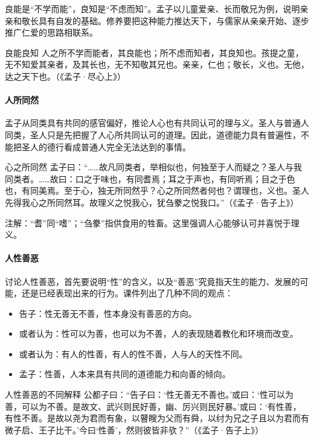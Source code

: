 良能是“不学而能”，良知是“不虑而知”。孟子以儿童爱亲、长而敬兄为例，说明亲亲和敬长具有自发的基础。修养要把这种能力推达天下，与儒家从亲亲开始、逐步推广仁爱的思路相联系。

\begin{fancybox}{良能良知}
    人之所不学而能者，其良能也；所不虑而知者，其良知也。孩提之童，无不知爱其亲者，及其长也，无不知敬其兄也。亲亲，仁也；敬长，义也。无他，达之天下也。（《孟子·尽心上》）
\end{fancybox}

\paragraph{人所同然}

孟子从同类具有共同的感官偏好，推论人心也有共同认可的理与义。圣人与普通人同类，圣人只是先把握了人心所共同认可的道理。因此，道德能力具有普遍性，不能把圣人的德行看成普通人完全无法达到的事情。

\begin{fancybox}{心之所同然}
    孟子曰：“……故凡同类者，举相似也，何独至于人而疑之？圣人与我同类者。……故曰：口之于味也，有同耆焉；耳之于声也，有同听焉；目之于色也，有同美焉。至于心，独无所同然乎？心之所同然者何也？谓理也，义也。圣人先得我心之所同然耳。故理义之悦我心，犹刍豢之悦我口。”（《孟子·告子上》）
\end{fancybox}

注解：“耆”同“嗜”；“刍豢”指供食用的牲畜。这里强调人心能够认可并喜悦于理义。

\paragraph{人性善恶}

讨论人性善恶，首先要说明“性”的含义，以及“善恶”究竟指天生的能力、发展的可能，还是已经表现出来的行为。课件列出了几种不同的观点：

\begin{itemize}
    \item 告子：性无善无不善，性本身没有善恶的方向。
    \item 或者认为：性可以为善，也可以为不善，人的表现随着教化和环境而改变。
    \item 或者认为：有人的性善，有人的性不善，人与人的天性不同。
    \item 孟子：性善，人本来具有共同的道德能力和向善的倾向。
\end{itemize}

\begin{fancybox}{人性善恶的不同解释}
    公都子曰：“告子曰：‘性无善无不善也。’或曰：‘性可以为善，可以为不善。是故文、武兴则民好善，幽、厉兴则民好暴。’或曰：‘有性善，有性不善。是故以尧为君而有象，以瞽瞍为父而有舜，以纣为兄之子且以为君而有微子启、王子比干。’今曰‘性善’，然则彼皆非欤？”（《孟子·告子上》）
\end{fancybox}

